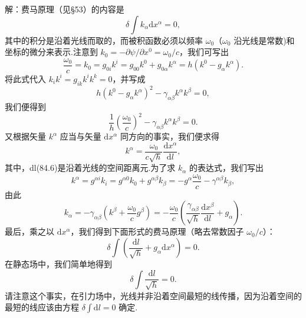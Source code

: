 \begin{xiti}
解：费马原理（见§53）的内容是
\begin{equation*}
  \delta\int k_{\alpha}\mathrm{d}x^{\alpha}=0,
\end{equation*}
其中的积分是沿着光线而取的，而被积函数必须以频率 $\omega_0$（$\omega_0$ 沿光线是常数)和坐标的微分来表示.注意到 $k_0=-\partial\psi/\partial x^0=\omega_0/c$，我们可写出
\begin{equation*}
  \frac{\omega_0}{c}=k_0=g_{0i}k^i=g_{00}k^0+g_{0\alpha}k^{\alpha}
  =h(k^0-g_{\alpha}k^{\alpha}).
\end{equation*}
将此式代入 $k_ik^i=g_{ik}k^ik^k=0$，并写成
\begin{equation*}
  h(k^0-g_{\alpha}k^{\alpha})^2-\gamma_{\alpha\beta}k^{\alpha}k^{\beta}=0,
\end{equation*}
我们便得到
\begin{equation*}
  \frac{1}{h}\left(\frac{\omega_0}{c}\right)^2
  -\gamma_{\alpha\beta}k^{\alpha}k^{\beta}=0.
\end{equation*}
又根据矢量 $k^{\alpha}$ 应当与矢量 $\mathrm{d}x^{\alpha}$ 同方向的事实，我们便求得
\begin{equation*}
  k^{\alpha}=\frac{\omega_0}{c\sqrt{h}}
  \frac{\mathrm{d}x^{\alpha}}{\mathrm{d}l},
\end{equation*}
其中，dl(84.6)是沿着光线的空间距离元.为了求 $k_{\alpha}$ 的表达式，我们写出
\begin{equation*}
  k^{\alpha}=g^{\alpha i}k_i=g^{\alpha 0}k_0+g^{\alpha\beta}k_{\beta}
  =-g^{\alpha}\frac{\omega_0}{c}-\gamma^{\alpha\beta}k_{\beta},
\end{equation*}
由此
\begin{equation*}
  k_{\alpha}=-\gamma_{\alpha\beta}\left(k^{\beta}
  +\frac{\omega_0}{c}g^{\beta}\right)
  =-\frac{\omega_0}{c}\left(\frac{\gamma_{\alpha\beta}}{\sqrt{h}}
  \frac{\mathrm{d}x^{\beta}}{\mathrm{d}l}+g_{\alpha}\right).
\end{equation*}
最后，乘之以 $\mathrm{d}x^{\alpha}$，我们得到下面形式的费马原理（略去常数因子 $\omega_0/c$）：
\begin{equation*}
  \delta\int\left(\frac{\mathrm{d}l}{\sqrt{h}}
  +g_{\alpha}\mathrm{d}x^{\alpha}\right)=0.
\end{equation*}
在静态场中，我们简单地得到
\begin{equation*}
  \delta\int\frac{\mathrm{d}l}{\sqrt{h}}=0.
\end{equation*}
请注意这个事实，在引力场中，光线并非沿着空间最短的线传播，因为沿着空间的最短的线应该由方程 $\delta\int\mathrm{d}l=0$ 确定.

\end{xiti}

